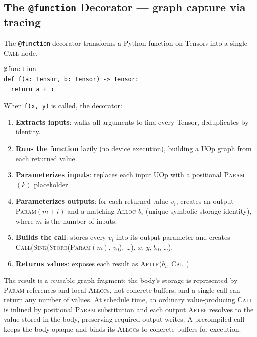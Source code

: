 \documentclass[10pt,letterpaper]{article}
\newcommand{\op}[1]{\textsc{#1}}
\begin{document}
\subsection*{{\color{callblue}The \texttt{@function} Decorator} \normalfont\small--- graph capture via tracing}

The \texttt{@function} decorator transforms a Python function on Tensors into a single \op{Call} node.

\begin{lstlisting}
@function
def f(a: Tensor, b: Tensor) -> Tensor:
  return a + b
\end{lstlisting}

When \texttt{f(x, y)} is called, the decorator:

\begin{enumerate}[leftmargin=1.5em, itemsep=2pt]
  \item \textbf{Extracts inputs}: walks all arguments to find every Tensor, deduplicates by identity.
  \item \textbf{Runs the function} lazily (no device execution), building a UOp graph from each returned value.
  \item \textbf{Parameterizes inputs}: replaces each input UOp with a positional \op{Param}$(k)$ placeholder.
  \item \textbf{Parameterizes outputs}: for each returned value $v_i$, creates an output \op{Param}$(m+i)$ and a matching \op{Alloc} $b_i$ (unique symbolic storage identity), where $m$ is the number of inputs.
  \item \textbf{Builds the call}: stores every $v_i$ into its output parameter and creates\\
        \op{Call}(\op{Sink}(\op{Store}(\op{Param}$(m)$, $v_0$), \ldots), $x$, $y$, $b_0$, \ldots).
  \item \textbf{Returns values}: exposes each result as \op{After}($b_i$, \op{Call}).
\end{enumerate}

The result is a reusable graph fragment: the body's storage is represented by \op{Param} references and local \op{Alloc}s, not concrete buffers, and a single call can return any number of values. At schedule time, an ordinary value-producing \op{Call} is inlined by positional \op{Param} substitution and each output \op{After} resolves to the value stored in the body, preserving required output writes. A precompiled call keeps the body opaque and binds its \op{Alloc}s to concrete buffers for execution.

\end{document}
